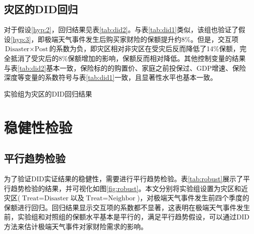 \subsection{灾区的DID回归}
对于假设\ref{hyp:2}，回归结果见表\ref{tab:did2}。与表\ref{tab:did1}类似，该组也验证了假设\ref{hyp:3}，即极端天气事件发生后购买家财险的保额提升约8\%。但是，交互项$\text{Disaster}\times \text{Post}$的系数为负，即灾区相对非灾区在受灾后反而降低了14\%保额，完全抵消了受灾后的8\%保额增加的影响，保额反而相对降低。其他控制变量的结果与表\ref{tab:did2}基本一致，保险标的的购置价、家庭之前投保过、GDP增速、保险深度等变量的系数符号与表\ref{tab:did1}一致，且显著性水平也基本一致。

\begin{table}[H]
    \centering
    \caption{实验组为灾区的DID回归结果}\label{tab:did2}
    
\end{table}

\section{稳健性检验}
\subsection{平行趋势检验}

为了验证DID实证结果的稳健性，需要进行平行趋势检验。表\ref{tab:robust}展示了平行趋势检验的结果，并可视化如图\ref{fig:robust}。本文分别将实验组设置为灾区和近灾区($\text{Treat}=\text{Disaster}$以及$\text{Treat}=\text{Neighbor}$)，对极端天气事件发生前四个季度的保额进行回归。回归结果显示交互项的系数都不显著，这表明在极端天气事件发生前，实验组和对照组的保额水平基本是平行的，满足平行趋势假设，可以通过DID方法来估计极端天气事件对家财险需求的影响。

